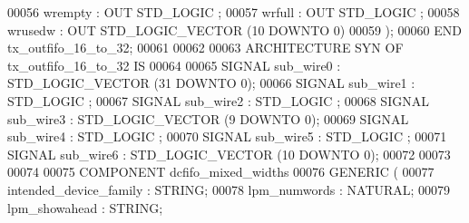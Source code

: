\begin{DoxyCode}
{00056         \textcolor{vhdlchar}{wrempty}     \textcolor{vhdlchar}{:} \textcolor{keywordflow}{OUT} \textcolor{comment}{STD\_LOGIC} ;
00057         \textcolor{vhdlchar}{wrfull}      \textcolor{vhdlchar}{:} \textcolor{keywordflow}{OUT} \textcolor{comment}{STD\_LOGIC} ;
00058         \textcolor{vhdlchar}{wrusedw}     \textcolor{vhdlchar}{:} \textcolor{keywordflow}{OUT} \textcolor{comment}{STD\_LOGIC\_VECTOR} \textcolor{vhdlchar}{(}\textcolor{vhdllogic}{}\textcolor{vhdllogic}{10} \textcolor{keywordflow}{DOWNTO} \textcolor{vhdllogic}{}\textcolor{vhdllogic}{0}\textcolor{vhdlchar}{)}
00059     \textcolor{vhdlchar}{)};
00060 \textcolor{keywordflow}{END} \textcolor{vhdlchar}{tx\_outfifo\_16\_to\_32};
00061 
00062 
00063 \textcolor{keywordflow}{ARCHITECTURE} SYN \textcolor{keywordflow}{OF} tx_outfifo_16_to_32 IS
00064 
00065     \textcolor{keywordflow}{SIGNAL} \textcolor{vhdlchar}{sub_wire0}    \textcolor{vhdlchar}{:} \textcolor{comment}{STD\_LOGIC\_VECTOR} \textcolor{vhdlchar}{(}\textcolor{vhdllogic}{}\textcolor{vhdllogic}{31} \textcolor{keywordflow}{DOWNTO} \textcolor{vhdllogic}{}\textcolor{vhdllogic}{0}\textcolor{vhdlchar}{)};
00066     \textcolor{keywordflow}{SIGNAL} \textcolor{vhdlchar}{sub_wire1}    \textcolor{vhdlchar}{:} \textcolor{comment}{STD\_LOGIC} ;
00067     \textcolor{keywordflow}{SIGNAL} \textcolor{vhdlchar}{sub_wire2}    \textcolor{vhdlchar}{:} \textcolor{comment}{STD\_LOGIC} ;
00068     \textcolor{keywordflow}{SIGNAL} \textcolor{vhdlchar}{sub_wire3}    \textcolor{vhdlchar}{:} \textcolor{comment}{STD\_LOGIC\_VECTOR} \textcolor{vhdlchar}{(}\textcolor{vhdllogic}{}\textcolor{vhdllogic}{9} \textcolor{keywordflow}{DOWNTO} \textcolor{vhdllogic}{}\textcolor{vhdllogic}{0}\textcolor{vhdlchar}{)};
00069     \textcolor{keywordflow}{SIGNAL} \textcolor{vhdlchar}{sub_wire4}    \textcolor{vhdlchar}{:} \textcolor{comment}{STD\_LOGIC} ;
00070     \textcolor{keywordflow}{SIGNAL} \textcolor{vhdlchar}{sub_wire5}    \textcolor{vhdlchar}{:} \textcolor{comment}{STD\_LOGIC} ;
00071     \textcolor{keywordflow}{SIGNAL} \textcolor{vhdlchar}{sub_wire6}    \textcolor{vhdlchar}{:} \textcolor{comment}{STD\_LOGIC\_VECTOR} \textcolor{vhdlchar}{(}\textcolor{vhdllogic}{}\textcolor{vhdllogic}{10} \textcolor{keywordflow}{DOWNTO} \textcolor{vhdllogic}{}\textcolor{vhdllogic}{0}\textcolor{vhdlchar}{)};
00072 
00073 
00074 
00075     \textcolor{keywordflow}{COMPONENT} dcfifo\_mixed\_widths
00076     \textcolor{keywordflow}{GENERIC} (
00077         intended\_device\_family      : \textcolor{comment}{STRING};
00078         lpm\_numwords        : \textcolor{comment}{NATURAL};
00079         lpm\_showahead       : \textcolor{comment}{STRING};
}
\end{DoxyCode}

